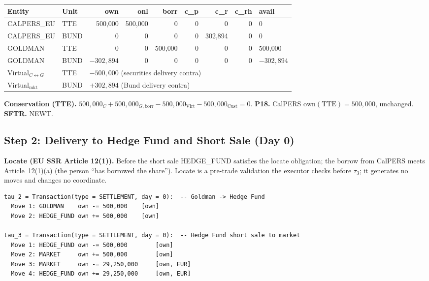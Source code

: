 \begin{center}\small
\begin{tabular}{l l r r r r r r l}
\toprule
\textbf{Entity} & \textbf{Unit} & own & onl & borr & c\_p & c\_r & c\_rh & avail \\
\midrule
CALPERS\_EU & TTE & 500{,}000 & 500{,}000 & 0 & 0 & 0 & 0 & 0 \\
CALPERS\_EU & BUND & 0 & 0 & 0 & 0 & 302{,}894 & 0 & 0 \\
GOLDMAN & TTE & 0 & 0 & 500{,}000 & 0 & 0 & 0 & 500{,}000 \\
GOLDMAN & BUND & $-302{,}894$ & 0 & 0 & 0 & 0 & 0 & $-302{,}894$ \\
Virtual$_{C{\leftrightarrow}G}$ & TTE & \multicolumn{7}{l}{$-500{,}000$ (securities delivery contra)} \\
Virtual$_{\mathrm{mkt}}$ & BUND & \multicolumn{7}{l}{$+302{,}894$ (Bund delivery contra)} \\
\bottomrule
\end{tabular}
\end{center}

\noindent\textbf{Conservation (TTE).} $500{,}000_C + 500{,}000_{G,\mathrm{borr}} - 500{,}000_{\mathrm{Virt}} - 500{,}000_{\mathrm{Cust}} = 0$. \checkmark\quad
\textbf{P18.} CalPERS $\mathrm{own}(\text{TTE}) = 500{,}000$, unchanged. \checkmark\quad
\textbf{SFTR.} NEWT.

\subsection{Step 2: Delivery to Hedge Fund and Short Sale (Day 0)}
\label{sec:eu-step2}

\textbf{Locate (EU SSR Article 12(1)).} Before the short sale HEDGE\_FUND satisfies the locate obligation; the borrow from CalPERS meets Article~12(1)(a) (the person ``has borrowed the share''). Locate is a pre-trade validation the executor checks before $\tau_3$; it generates no moves and changes no coordinate.

\begin{lstlisting}
tau_2 = Transaction(type = SETTLEMENT, day = 0):  -- Goldman -> Hedge Fund
  Move 1: GOLDMAN    own -= 500,000    [own]
  Move 2: HEDGE_FUND own += 500,000    [own]

tau_3 = Transaction(type = SETTLEMENT, day = 0):  -- Hedge Fund short sale to market
  Move 1: HEDGE_FUND own -= 500,000        [own]
  Move 2: MARKET     own += 500,000        [own]
  Move 3: MARKET     own -= 29,250,000     [own, EUR]
  Move 4: HEDGE_FUND own += 29,250,000     [own, EUR]
\end{lstlisting}


